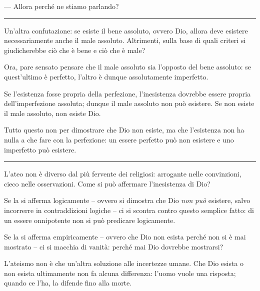\documentclass[a4paper,oneside,11pt]{memoir}
\begin{document}
--- Allora perché ne stiamo parlando?

\plainbreak{1}

Un'altra confutazione: se esiste il bene assoluto, ovvero Dio, allora deve
esistere necessariamente anche il male assoluto. Altrimenti, sulla base di quali
criteri si giudicherebbe ciò che è bene e ciò che è male?

Ora, pare sensato pensare che il male assoluto sia l'opposto del bene assoluto:
se quest'ultimo è perfetto, l'altro è dunque assolutamente imperfetto.

Se l'esistenza fosse propria della perfezione, l'inesistenza dovrebbe essere
propria dell'imperfezione assoluta; dunque il male assoluto non può esistere. Se
non esiste il male assoluto, non esiste Dio.

Tutto questo non per dimostrare che Dio non esiste, ma che l'esistenza non ha
nulla a che fare con la perfezione: un essere perfetto può non esistere e uno
imperfetto può esistere.

\plainbreak{1}

L'ateo non è diverso dal più fervente dei religiosi: arrogante nelle
convinzioni, cieco nelle osservazioni. Come si può affermare l'inesistenza di
Dio?

Se la si afferma logicamente -- ovvero si dimostra che Dio \emph{non può}
esistere, salvo incorrerre in contraddizioni logiche -- ci si scontra contro
questo semplice fatto: di un essere onnipotente non si può predicare
logicamente.

Se la si afferma empiricamente -- ovvero che Dio non esista perché non si è mai
mostrato -- ci si macchia di vanità: perché mai Dio dovrebbe mostrarsi?

L'ateismo non è che un'altra soluzione alle incertezze umane. Che Dio esista o
non esista ultimamente non fa alcuna differenza: l'uomo vuole una risposta;
quando ce l'ha, la difende fino alla morte.

\backmatter

\tableofcontents
\end{document}
